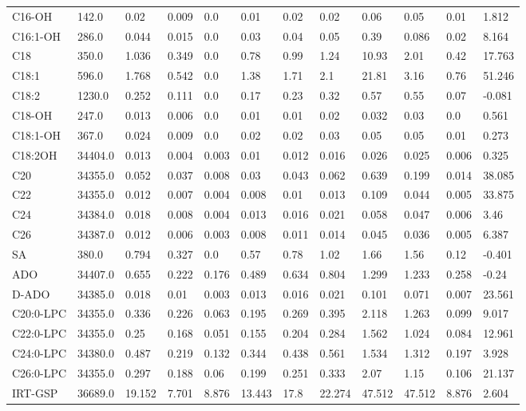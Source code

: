 \begin{tabular}{|l|l|l|l|l|l|l|l|l|l|l|l|}
C16-OH & 142.0 & 0.02 & 0.009 & 0.0 & 0.01 & 0.02 & 0.02 & 0.06 & 0.05 & 0.01 & 1.812 \\
C16:1-OH & 286.0 & 0.044 & 0.015 & 0.0 & 0.03 & 0.04 & 0.05 & 0.39 & 0.086 & 0.02 & 8.164 \\
C18 & 350.0 & 1.036 & 0.349 & 0.0 & 0.78 & 0.99 & 1.24 & 10.93 & 2.01 & 0.42 & 17.763 \\
C18:1 & 596.0 & 1.768 & 0.542 & 0.0 & 1.38 & 1.71 & 2.1 & 21.81 & 3.16 & 0.76 & 51.246 \\
C18:2 & 1230.0 & 0.252 & 0.111 & 0.0 & 0.17 & 0.23 & 0.32 & 0.57 & 0.55 & 0.07 & -0.081 \\
C18-OH & 247.0 & 0.013 & 0.006 & 0.0 & 0.01 & 0.01 & 0.02 & 0.032 & 0.03 & 0.0 & 0.561 \\
C18:1-OH & 367.0 & 0.024 & 0.009 & 0.0 & 0.02 & 0.02 & 0.03 & 0.05 & 0.05 & 0.01 & 0.273 \\
C18:2OH & 34404.0 & 0.013 & 0.004 & 0.003 & 0.01 & 0.012 & 0.016 & 0.026 & 0.025 & 0.006 & 0.325 \\
C20 & 34355.0 & 0.052 & 0.037 & 0.008 & 0.03 & 0.043 & 0.062 & 0.639 & 0.199 & 0.014 & 38.085 \\
C22 & 34355.0 & 0.012 & 0.007 & 0.004 & 0.008 & 0.01 & 0.013 & 0.109 & 0.044 & 0.005 & 33.875 \\
C24 & 34384.0 & 0.018 & 0.008 & 0.004 & 0.013 & 0.016 & 0.021 & 0.058 & 0.047 & 0.006 & 3.46 \\
C26 & 34387.0 & 0.012 & 0.006 & 0.003 & 0.008 & 0.011 & 0.014 & 0.045 & 0.036 & 0.005 & 6.387 \\
SA & 380.0 & 0.794 & 0.327 & 0.0 & 0.57 & 0.78 & 1.02 & 1.66 & 1.56 & 0.12 & -0.401 \\
ADO & 34407.0 & 0.655 & 0.222 & 0.176 & 0.489 & 0.634 & 0.804 & 1.299 & 1.233 & 0.258 & -0.24 \\
D-ADO & 34385.0 & 0.018 & 0.01 & 0.003 & 0.013 & 0.016 & 0.021 & 0.101 & 0.071 & 0.007 & 23.561 \\
C20:0-LPC & 34355.0 & 0.336 & 0.226 & 0.063 & 0.195 & 0.269 & 0.395 & 2.118 & 1.263 & 0.099 & 9.017 \\
C22:0-LPC & 34355.0 & 0.25 & 0.168 & 0.051 & 0.155 & 0.204 & 0.284 & 1.562 & 1.024 & 0.084 & 12.961 \\
C24:0-LPC & 34380.0 & 0.487 & 0.219 & 0.132 & 0.344 & 0.438 & 0.561 & 1.534 & 1.312 & 0.197 & 3.928 \\
C26:0-LPC & 34355.0 & 0.297 & 0.188 & 0.06 & 0.199 & 0.251 & 0.333 & 2.07 & 1.15 & 0.106 & 21.137 \\
IRT-GSP & 36689.0 & 19.152 & 7.701 & 8.876 & 13.443 & 17.8 & 22.274 & 47.512 & 47.512 & 8.876 & 2.604 \\

\end{tabular}
